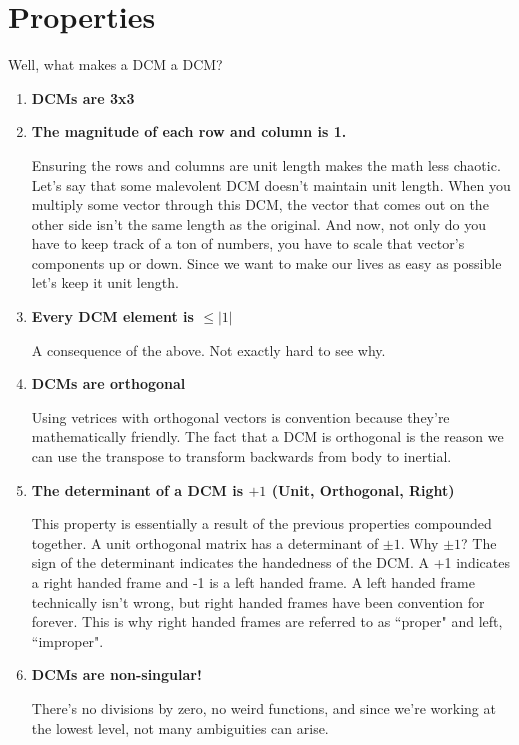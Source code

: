 \documentclass[a4paper,14pt]{extreport}
\begin{document}
\section{Properties}
Well, what makes a DCM a DCM?
\begin{enumerate}
\item{\textbf{DCMs are 3x3}}

\item{\textbf{The magnitude of each row and column is 1.}}

Ensuring the rows and columns are unit length makes the math less chaotic. Let's say that some malevolent DCM doesn't maintain unit length. When you multiply some vector through this DCM, the vector that comes out on the other side isn't the same length as the original. And now, not only do you have to keep track of a ton of numbers, you have to scale that vector's components up or down. Since we want to make our lives as easy as possible let's keep it unit length.

\item{\textbf{Every DCM element is $\leq |1|$}}

A consequence of the above. Not exactly hard to see why.

\item{\textbf{DCMs are orthogonal}}

Using vetrices with orthogonal vectors is convention because they're mathematically friendly. The fact that a DCM is orthogonal is the reason we can use the transpose to transform backwards from body to inertial.

\item{\textbf{The determinant of a DCM is $+1$ (Unit, Orthogonal, Right)}}

This property is essentially a result of the previous properties compounded together. A unit orthogonal matrix has a determinant of $\pm 1$. Why $\pm 1$? The sign of the determinant indicates the handedness of the DCM. A +1 indicates a right handed frame and -1 is a left handed frame. A left handed frame technically isn't wrong, but right handed frames have been convention for forever. This is why right handed frames are referred to as ``proper" and left, ``improper".

\item{\textbf{DCMs are non-singular!}}

There's no divisions by zero, no weird functions, and since we're working at the lowest level, not many ambiguities can arise.
\end{enumerate}
\end{document}
